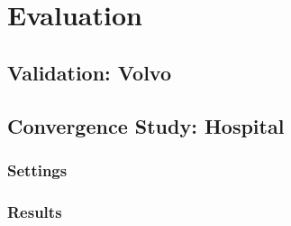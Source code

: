 \section{Evaluation}


\subsection{Validation: Volvo}
\subsection{Convergence Study: Hospital}
\subsubsection{Settings}
\subsubsection{Results}
